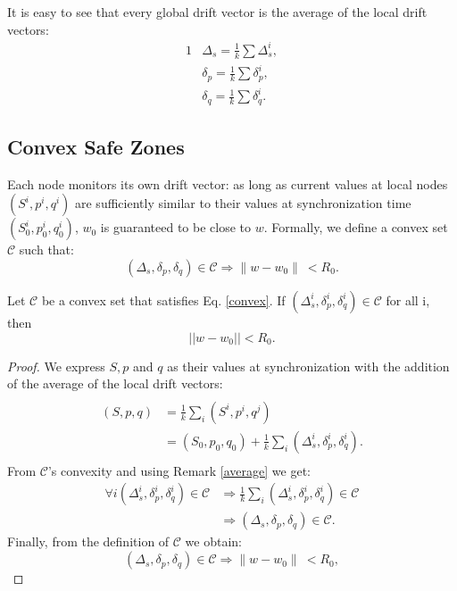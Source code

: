 \documentclass{vldb}
\begin{document}
\begin{remark} \label{average}
It is easy to see that every global drift vector is the average of the local drift vectors:
\begin{alignat*}{1}
& \Delta_s = \frac{1}{k} \sum \Delta_s^i, \\
& \delta_p = \frac{1}{k} \sum \delta_p^i, \\
& \delta_q = \frac{1}{k} \sum \delta_q^i.
\end{alignat*}

\end{remark}

\subsection{Convex Safe Zones}
Each node monitors its own drift vector: as long as current values
at local nodes $(S^i,p^i,q^i)$ are sufficiently similar to their values
at synchronization time $(S^i_0,p^i_0,q^i_0)$, $w_0$ is guaranteed to be close to $w$.
Formally, we define a convex set $\mathcal{C}$ such that:
\begin{equation} \label{convex}
(\Delta_s, \delta_p, \delta_q) \in \mathcal{C} \Rightarrow \parallel w-w_0
\parallel \ < R_0.
\end{equation}
\begin{lemma} \label{averages}
Let $\mathcal{C}$ be a convex set that satisfies Eq. \ref{convex}.
If $(\Delta_s^i, \delta_p^i, \delta_q^i) \in \mathcal{C}$ for all i, then
\begin{equation*}
||w-w_0|| < R_0.
\end{equation*}
\end{lemma}
\begin{proof}
We express $S, p$ and $q$ as their values at synchronization with the addition of the average of the local drift vectors:
\begin{equation}
\begin{split}
\\(S,p,q) & = \frac{1}{k} \sum_i (S^i,p^i,q^j) \\
 & = (S_0,p_0,q_0) + \frac{1}{k} \sum_i (\Delta_s^i,\delta^i_p,\delta_q^i). \\
\end{split}
\end{equation}
From $\mathcal{C}$'s convexity and using Remark \ref{average} we get:
\begin{equation}
\begin{split}
\forall i (\Delta_s^i,\delta^i_p,\delta_q^i) \in \mathcal{C} & \Rightarrow
\frac{1}{k} \sum_i (\Delta_s^i,\delta^i_p,\delta_q^i) \in \mathcal{C} \\
& \Rightarrow (\Delta_s,\delta_p,\delta_q) \in \mathcal{C}.
\end{split}
\end{equation}
Finally, from the definition of $\mathcal{C}$ we obtain:
\begin{equation}
(\Delta_s,\delta_p,\delta_q) \in \mathcal{C} \Rightarrow \parallel w-w_0
\parallel \ < R_0,
\end{equation}
\end{proof}
\end{document}
